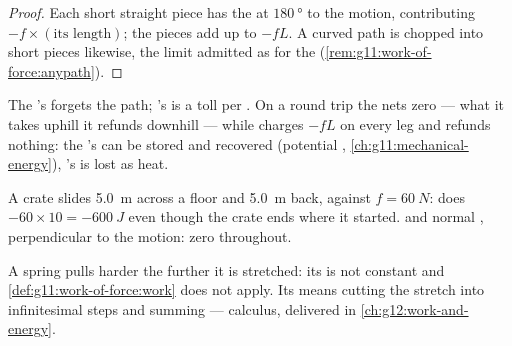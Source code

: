 \begin{proof}
Each short straight piece has the  at $\qty{180}{\degree}$ to the
motion, contributing $-f \times (\text{its length})$; the pieces add
up to $-fL$. A curved path is chopped into short pieces likewise, the
limit admitted as for the  (\cref{rem:g11:work-of-force:anypath}).
\end{proof}

\begin{remark}\label{rem:g11:work-of-force:divide}
The 's  forgets the path; 's is a toll per . On
a round trip the  nets zero --- what it takes uphill it refunds
downhill --- while  charges $-fL$ on every leg and refunds
nothing: the 's  can be stored and recovered (potential
, \cref{ch:g11:mechanical-energy}), 's is lost as heat.
\end{remark}

\begin{example}\label{ex:g11:work-of-force:roundtrip}
A crate slides \qty{5.0}{m} across a floor and \qty{5.0}{m} back,
against $f = \qty{60}{N}$:  does $-60 \times 10 =
\qty{-600}{J}$ even though the crate ends where it started.  and
normal , perpendicular to the motion: zero throughout.
\end{example}

\begin{remark}\label{rem:g11:work-of-force:spring}
A spring pulls harder the further it is stretched: its  is not
constant and \cref{def:g11:work-of-force:work} does not apply.
Its  means cutting the stretch into infinitesimal steps and
summing --- calculus, delivered in \cref{ch:g12:work-and-energy}.
\end{remark}

